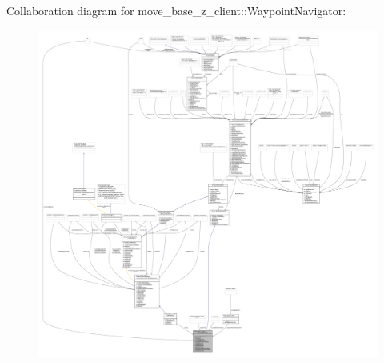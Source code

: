 Collaboration diagram for move\+\_\+base\+\_\+z\+\_\+client\+:\+:Waypoint\+Navigator\+:
\nopagebreak
\begin{figure}[H]
\begin{center}
\leavevmode
\includegraphics[width=350pt]{classmove__base__z__client_1_1WaypointNavigator__coll__graph}
\end{center}
\end{figure}
